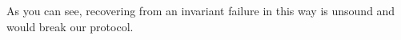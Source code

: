 As you can see, recovering from an invariant failure in this way is unsound and would break our protocol.

















